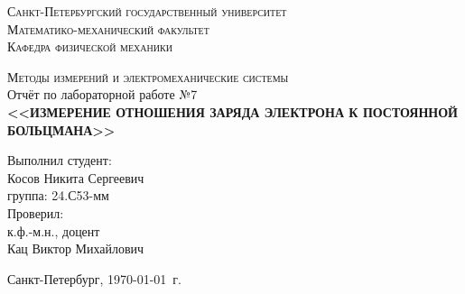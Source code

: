 \begin{titlepage}
\begin{center}
\textsc{Санкт-Петербургский государственный университет\\
Математико-механический факультет\\
Кафедра физической механики\\}

\vfill

\textsc{Методы измерений и электромеханические системы\\[3mm]}
Отчёт по лабораторной работе №7\\[6mm]


\textbf{\large<<ИЗМЕРЕНИЕ ОТНОШЕНИЯ ЗАРЯДА ЭЛЕКТРОНА К ПОСТОЯННОЙ БОЛЬЦМАНА>>}

\vfill
\end{center}

\hfill
\begin{minipage}{.5\textwidth}
Выполнил студент:\\[2mm] 
Косов Никита Сергеевич\\
группа: 24.С53-мм\\[5mm]

Проверил:\\[2mm] 
к.ф.-м.н., доцент\\
Кац Виктор Михайлович
\end{minipage}%
\vfill
\begin{center}
 Санкт-Петербург, \yeardate\today\ г.
\end{center}
\end{titlepage}